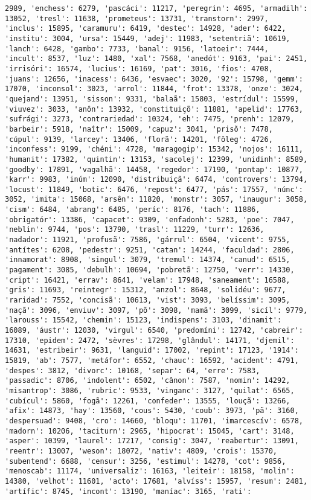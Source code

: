 \begin{Verbatim}[commandchars=\\\{\}]
2989, 'enchess': 6279, 'pascáci': 11217, 'peregrin': 4695, 'armadilh': 13052, 'tresl': 11638, 'prometeus': 13731, 'transtorn': 2997, 'inclus': 15895, 'caramuru': 6419, 'destec': 14928, 'ader': 6422, 'institu': 3004, 'ursa': 15449, 'adej': 11983, 'setentriã': 10619, 'lanch': 6428, 'gambo': 7733, 'banal': 9156, 'latoeir': 7444, 'incult': 8537, 'luz': 1480, 'xal': 7568, 'anedót': 9163, 'pai': 2451, 'irrisóri': 16574, 'lucius': 16169, 'pat': 3016, 'fios': 4708, 'juans': 12656, 'inacess': 6436, 'esvaec': 3020, '92': 15798, 'gemm': 17070, 'inconsol': 3023, 'arrol': 11844, 'frot': 13378, 'onze': 3024, 'quejand': 13951, 'sisson': 9331, 'balaã': 15803, 'estrídul': 15599, 'viuvez': 3033, 'anôn': 13932, 'constituiçõ': 11881, 'apelid': 17763, 'sufrági': 3273, 'contrariedad': 10324, 'eh': 7475, 'prenh': 12079, 'barbeir': 5918, 'naîtr': 15009, 'capuz': 3041, 'prisõ': 7478, 'cúpul': 9139, 'larcey': 13406, 'florã': 14201, 'fôleg': 4726, 'inconfess': 9199, 'chéni': 4728, 'maragogip': 15342, 'nojos': 16111, 'humanit': 17382, 'quintin': 13153, 'sacolej': 12399, 'unidinh': 8589, 'goodby': 17891, 'vagalhã': 14458, 'regedor': 17190, 'pontap': 10877, 'karr': 9983, 'inúm': 12090, 'distribuiçã': 6474, 'controvers': 13794, 'locust': 11849, 'botic': 6476, 'repost': 6477, 'pás': 17557, 'núnc': 3052, 'imita': 15068, 'arsên': 11820, 'monstr': 3057, 'inaugur': 3058, 'cism': 6484, 'abrang': 6485, 'períc': 8176, 'tach': 11886, 'obrigatór': 13386, 'capacet': 9309, 'enfadonh': 5283, 'poe': 7047, 'neblin': 9744, 'pos': 13790, 'trasl': 11229, 'turr': 12636, 'nadador': 11921, 'profusã': 7586, 'gárrul': 6504, 'vicent': 9755, 'antítes': 6208, 'pedestr': 9251, 'catan': 14244, 'faculdad': 2806, 'innamorat': 8908, 'singul': 3079, 'tremul': 14374, 'canud': 6515, 'pagament': 3085, 'debulh': 10694, 'pobretã': 12750, 'verr': 14330, 'cript': 16421, 'errav': 8641, 'velam': 17948, 'saneament': 16588, 'gris': 11693, 'reintegr': 15312, 'anzol': 8648, 'solidéu': 9677, 'raridad': 7552, 'concisã': 10613, 'vist': 3093, 'belíssim': 3095, 'naçã': 3096, 'enviuv': 3097, 'põ': 3098, 'mamã': 3099, 'sicíl': 9779, 'larouss': 15542, 'chemin': 15123, 'indispens': 3103, 'dinamit': 16089, 'áustr': 12030, 'virgul': 6540, 'predomíni': 12742, 'cabreir': 17310, 'epidem': 2472, 'sèvres': 17298, 'glândul': 14171, 'djemil': 14631, 'estribeir': 9631, 'languid': 17002, 'repint': 17123, '1914': 15819, 'ab': 7577, 'metáfor': 6552, 'chauc': 16592, 'acident': 4791, 'despes': 3812, 'divorc': 10168, 'separ': 64, 'erre': 7583, 'passadic': 8706, 'indolent': 6502, 'cânon': 7587, 'nomin': 14292, 'misantrop': 3086, 'rubric': 9533, 'vinganc': 3127, 'quilat': 6565, 'cubícul': 5860, 'fogã': 12261, 'confeder': 13555, 'louçã': 13266, 'afix': 14873, 'hay': 13560, 'cous': 5430, 'coub': 3973, 'pã': 3160, 'despersuad': 9408, 'cro': 14660, 'bloqu': 11701, 'imarcescív': 6578, 'madorn': 10206, 'taciturn': 2965, 'hipocrat': 15045, 'cart': 3148, 'asper': 10399, 'laurel': 17217, 'consig': 3047, 'reabertur': 13091, 'reentr': 13007, 'weson': 18072, 'nativ': 4809, 'crois': 15370, 'subentend': 6688, 'censur': 3256, 'estimul': 14278, 'cot': 9856, 'menoscab': 11174, 'universaliz': 16163, 'leiteir': 18158, 'molin': 14380, 'velhot': 11601, 'acto': 17681, 'alvíss': 15957, 'resum': 2481, 'artífic': 8745, 'incont': 13190, 'maníac': 3165, 'rati': 
\end{Verbatim}
